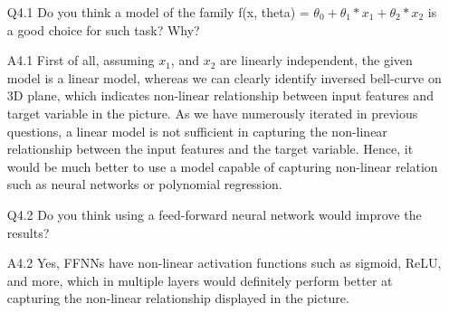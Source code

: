 \documentclass[11pt]{scrartcl}
\begin{document}
\begin{itemize}
\item[Q4.1] Do you think a model of the family f(x, theta) = $\theta_0 + \theta_1 * x_1 + \theta_2 * x_2$ is a good choice for such task? Why?

\item [A4.1] First of all, assuming $x_1$, and $x_2$ are linearly independent, the given model is a linear model, whereas we can clearly identify inversed bell-curve on 3D plane, which indicates non-linear relationship between input features and target variable in the picture. As we have numerously iterated in previous questions, a linear model is not sufficient in capturing the non-linear relationship between the input features and the target variable. Hence, it would be much better to use a model capable of capturing non-linear relation such as neural networks or polynomial regression. \\

\item[Q4.2] Do you think using a feed-forward neural network would improve the results?

\item[A4.2] Yes, FFNNs have non-linear activation functions such as sigmoid, ReLU, and more, which in multiple layers would definitely perform better at capturing the non-linear relationship displayed in the picture.

\end{itemize}
\end{document}
